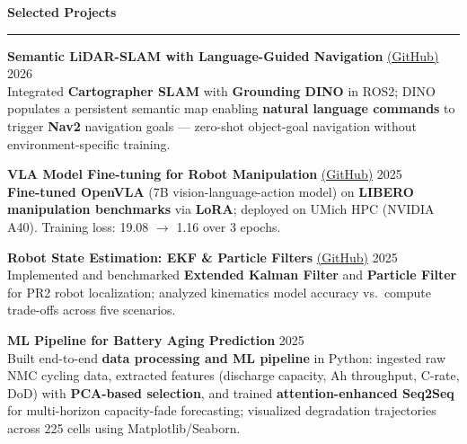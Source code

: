 \documentclass[9pt]{article}
\newcommand{\sect}[1]{\vspace{4pt}\noindent\textbf{\large #1}\vspace{3pt}\hrule\vspace{6pt}}
\begin{document}
\sect{Selected Projects}

\textbf{Semantic LiDAR-SLAM with Language-Guided Navigation} \href{https://github.com/chittinvarunav/VLSGN_ROB530-Team21}{(GitHub)} \hfill 2026\\
Integrated \textbf{Cartographer SLAM} with \textbf{Grounding DINO} in ROS2; DINO populates a persistent semantic map enabling \textbf{natural language commands} to trigger \textbf{Nav2} navigation goals --- zero-shot object-goal navigation without environment-specific training.

\textbf{VLA Model Fine-tuning for Robot Manipulation} \href{https://github.com/Thiruloksundar/OpenVLA-Libero-finetuning}{(GitHub)} \hfill 2025\\
\textbf{Fine-tuned OpenVLA} (7B vision-language-action model) on \textbf{LIBERO manipulation benchmarks} via \textbf{LoRA}; deployed on UMich HPC (NVIDIA A40). Training loss: 19.08 $\rightarrow$ 1.16 over 3 epochs.

\textbf{Robot State Estimation: EKF \& Particle Filters} \href{https://github.com/Thiruloksundar/robot_state_estimation}{(GitHub)} \hfill 2025\\
Implemented and benchmarked \textbf{Extended Kalman Filter} and \textbf{Particle Filter} for PR2 robot localization; analyzed kinematics model accuracy vs.\ compute trade-offs across five scenarios.

\textbf{ML Pipeline for Battery Aging Prediction} \hfill 2025\\
Built end-to-end \textbf{data processing and ML pipeline} in Python: ingested raw NMC cycling data, extracted features (discharge capacity, Ah throughput, C-rate, DoD) with \textbf{PCA-based selection}, and trained \textbf{attention-enhanced Seq2Seq} for multi-horizon capacity-fade forecasting; visualized degradation trajectories across 225 cells using Matplotlib/Seaborn.
\end{document}
